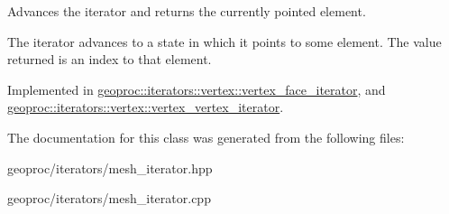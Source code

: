 Advances the iterator and returns the currently pointed element. 

The iterator advances to a state in which it points to some element. The value returned is an index to that element. 

Implemented in \hyperlink{classgeoproc_1_1iterators_1_1vertex_1_1vertex__face__iterator_aa2a7fb3ee7e703d815e7f1664fbd99d4}{geoproc\+::iterators\+::vertex\+::vertex\+\_\+face\+\_\+iterator}, and \hyperlink{classgeoproc_1_1iterators_1_1vertex_1_1vertex__vertex__iterator_ad2041720a1d35892804c659de7b2dd44}{geoproc\+::iterators\+::vertex\+::vertex\+\_\+vertex\+\_\+iterator}.



The documentation for this class was generated from the following files\+:\begin{DoxyCompactItemize}
\item 
geoproc/iterators/mesh\+\_\+iterator.\+hpp\item 
geoproc/iterators/mesh\+\_\+iterator.\+cpp\end{DoxyCompactItemize}
